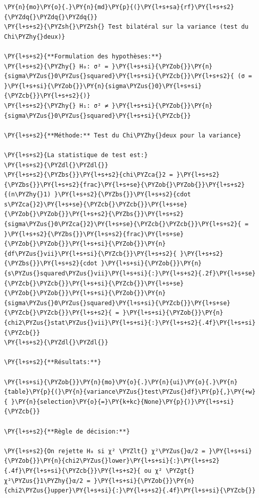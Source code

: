    \begin{tcolorbox}[breakable, size=fbox, boxrule=1pt, pad at break*=1mm,colback=cellbackground, colframe=cellborder]
\begin{Verbatim}[commandchars=\\\{\}]
\PY{n}{mo}\PY{o}{.}\PY{n}{md}\PY{p}{(}\PY{l+s+sa}{rf}\PY{l+s+s2}{\PYZdq{}\PYZdq{}\PYZdq{}}
\PY{l+s+s2}{\PYZsh{}\PYZsh{} Test bilatéral sur la variance (test du Chi\PYZhy{}deux)}

\PY{l+s+s2}{**Formulation des hypothèses:**}
\PY{l+s+s2}{\PYZhy{} H₀: σ² = }\PY{l+s+si}{\PYZob{}}\PY{n}{sigma\PYZus{}0\PYZus{}squared}\PY{l+s+si}{\PYZcb{}}\PY{l+s+s2}{ (σ = }\PY{l+s+si}{\PYZob{}}\PY{n}{sigma\PYZus{}0}\PY{l+s+si}{\PYZcb{}}\PY{l+s+s2}{)}
\PY{l+s+s2}{\PYZhy{} H₁: σ² ≠ }\PY{l+s+si}{\PYZob{}}\PY{n}{sigma\PYZus{}0\PYZus{}squared}\PY{l+s+si}{\PYZcb{}}

\PY{l+s+s2}{**Méthode:** Test du Chi\PYZhy{}deux pour la variance}

\PY{l+s+s2}{La statistique de test est:}
\PY{l+s+s2}{\PYZdl{}\PYZdl{}}
\PY{l+s+s2}{\PYZbs{}}\PY{l+s+s2}{chi\PYZca{}2 = }\PY{l+s+s2}{\PYZbs{}}\PY{l+s+s2}{frac}\PY{l+s+se}{\PYZob{}\PYZob{}}\PY{l+s+s2}{(n\PYZhy{}1) }\PY{l+s+s2}{\PYZbs{}}\PY{l+s+s2}{cdot s\PYZca{}2}\PY{l+s+se}{\PYZcb{}\PYZcb{}}\PY{l+s+se}{\PYZob{}\PYZob{}}\PY{l+s+s2}{\PYZbs{}}\PY{l+s+s2}{sigma\PYZus{}0\PYZca{}2}\PY{l+s+se}{\PYZcb{}\PYZcb{}}\PY{l+s+s2}{ = }\PY{l+s+s2}{\PYZbs{}}\PY{l+s+s2}{frac}\PY{l+s+se}{\PYZob{}\PYZob{}}\PY{l+s+si}{\PYZob{}}\PY{n}{df\PYZus{}vii}\PY{l+s+si}{\PYZcb{}}\PY{l+s+s2}{ }\PY{l+s+s2}{\PYZbs{}}\PY{l+s+s2}{cdot }\PY{l+s+si}{\PYZob{}}\PY{n}{s\PYZus{}squared\PYZus{}vii}\PY{l+s+si}{:}\PY{l+s+s2}{.2f}\PY{l+s+se}{\PYZcb{}\PYZcb{}}\PY{l+s+si}{\PYZcb{}}\PY{l+s+se}{\PYZob{}\PYZob{}}\PY{l+s+si}{\PYZob{}}\PY{n}{sigma\PYZus{}0\PYZus{}squared}\PY{l+s+si}{\PYZcb{}}\PY{l+s+se}{\PYZcb{}\PYZcb{}}\PY{l+s+s2}{ = }\PY{l+s+si}{\PYZob{}}\PY{n}{chi2\PYZus{}stat\PYZus{}vii}\PY{l+s+si}{:}\PY{l+s+s2}{.4f}\PY{l+s+si}{\PYZcb{}}
\PY{l+s+s2}{\PYZdl{}\PYZdl{}}

\PY{l+s+s2}{**Résultats:**}

\PY{l+s+si}{\PYZob{}}\PY{n}{mo}\PY{o}{.}\PY{n}{ui}\PY{o}{.}\PY{n}{table}\PY{p}{(}\PY{n}{variance\PYZus{}test\PYZus{}df}\PY{p}{,}\PY{+w}{ }\PY{n}{selection}\PY{o}{=}\PY{k+kc}{None}\PY{p}{)}\PY{l+s+si}{\PYZcb{}}

\PY{l+s+s2}{**Règle de décision:**}

\PY{l+s+s2}{On rejette H₀ si χ² \PYZlt{} χ²\PYZus{}α/2 = }\PY{l+s+si}{\PYZob{}}\PY{n}{chi2\PYZus{}lower}\PY{l+s+si}{:}\PY{l+s+s2}{.4f}\PY{l+s+si}{\PYZcb{}}\PY{l+s+s2}{ ou χ² \PYZgt{} χ²\PYZus{}1\PYZhy{}α/2 = }\PY{l+s+si}{\PYZob{}}\PY{n}{chi2\PYZus{}upper}\PY{l+s+si}{:}\PY{l+s+s2}{.4f}\PY{l+s+si}{\PYZcb{}}


\end{Verbatim}
\end{tcolorbox}
